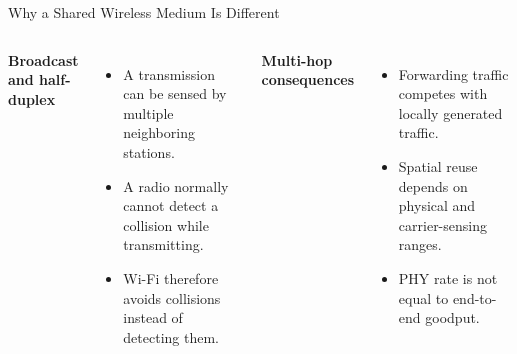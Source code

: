 \begin{frame}{Why a Shared Wireless Medium Is Different}
\begin{columns}[T,onlytextwidth]
\textbf{Broadcast and half-duplex}
\begin{itemize}
\item A transmission can be sensed by multiple neighboring stations.
\item A radio normally cannot detect a collision while transmitting.
\item Wi-Fi therefore avoids collisions instead of detecting them.
\end{itemize}
\textbf{Multi-hop consequences}
\begin{itemize}
\item Forwarding traffic competes with locally generated traffic.
\item Spatial reuse depends on physical and carrier-sensing ranges.
\item PHY rate is not equal to end-to-end goodput.
\end{itemize}
\end{columns}
\vspace{0.35cm}
\begin{center}
\end{center}
\end{frame}



